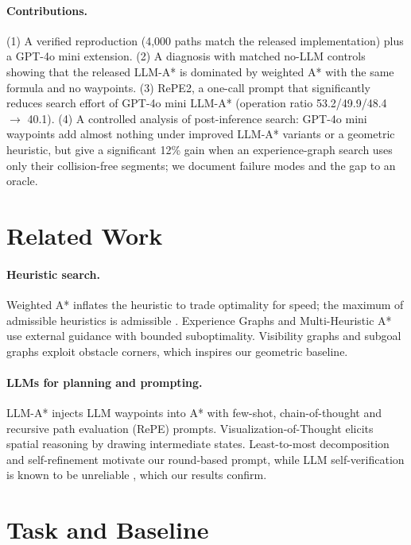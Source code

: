 \documentclass[11pt]{article}
\begin{document}
\paragraph{Contributions.}
(1) A verified reproduction (4{,}000 paths match the released implementation) plus a GPT-4o mini extension.
(2) A diagnosis with matched no-LLM controls showing that the released LLM-A* is dominated by weighted A* with the same formula and no waypoints.
(3) RePE2, a one-call prompt that significantly reduces search effort of GPT-4o mini LLM-A* (operation ratio 53.2/49.9/48.4 $\rightarrow$ 40.1).
(4) A controlled analysis of post-inference search: GPT-4o mini waypoints add almost nothing under improved LLM-A* variants or a geometric heuristic, but give a significant 12\% gain when an experience-graph search uses only their collision-free segments; we document failure modes and the gap to an oracle.

\section{Related Work}
\paragraph{Heuristic search.}
Weighted A* \citep{pohl1970weighted} inflates the heuristic to trade optimality for speed; the maximum of admissible heuristics is admissible \citep{pearl1984heuristics}.
Experience Graphs \citep{phillips2012egraphs} and Multi-Heuristic A* \citep{aine2016mha} use external guidance with bounded suboptimality.
Visibility graphs \citep{lozano1979visibility} and subgoal graphs \citep{uras2013subgoal} exploit obstacle corners, which inspires our geometric baseline.
\paragraph{LLMs for planning and prompting.}
LLM-A* \citep{meng2024llmastar} injects LLM waypoints into A* with few-shot, chain-of-thought \citep{wei2022cot} and recursive path evaluation (RePE) prompts.
Visualization-of-Thought \citep{wu2024vot} elicits spatial reasoning by drawing intermediate states.
Least-to-most decomposition \citep{zhou2023leasttomost} and self-refinement \citep{madaan2023selfrefine} motivate our round-based prompt, while LLM self-verification is known to be unreliable \citep{huang2024selfcorrect}, which our results confirm.

\section{Task and Baseline}
\label{sec:repro}
\end{document}

